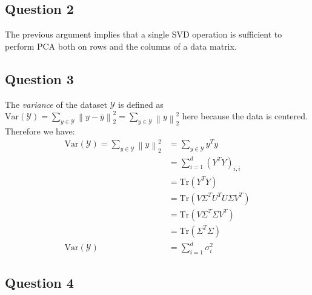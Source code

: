 \documentclass{article}
\begin{document}
\subsection{Question 2}

The previous argument implies that a single SVD operation is sufficient to perform PCA both on rows and the columns of a data matrix.

\subsection{Question 3}

The \textit{variance} of the dataset $\mathcal{Y}$ is defined as $\text{Var}(\mathcal{Y}) = \sum_{y \in \mathcal{Y}} \left\lVert y - \overline{y} \right\rVert^2_2 = \sum_{y \in \mathcal{Y}} \left\lVert y \right\rVert^2_2$ here because the data is centered. Therefore we have:
\begin{equation}
    \begin{split}
        \text{Var}(\mathcal{Y}) = \sum_{y \in \mathcal{Y}} \left\lVert y \right\rVert^2_2 & = \sum_{y \in \mathcal{Y}} y^T y         \\
                                                                                          & = \sum_{i = 1}^d (Y^T Y)_{i, i}          \\
                                                                                          & = \text{Tr}(Y^T Y)                       \\
                                                                                          & = \text{Tr}(V \Sigma^T U^T U \Sigma V^T) \\
                                                                                          & = \text{Tr}(V \Sigma^T \Sigma V^T)       \\
                                                                                          & = \text{Tr}(\Sigma^T \Sigma)             \\
        \text{Var}(\mathcal{Y})                                                           & = \sum_{i = 1}^d \sigma_i^2
    \end{split}
\end{equation}

\subsection{Question 4}
\end{document}
